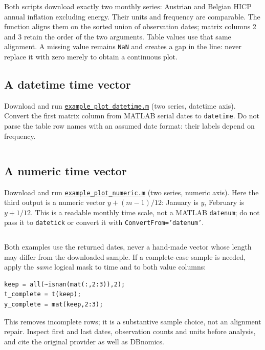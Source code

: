 \documentclass[a4paper,12pt]{article}
\begin{document}
Both scripts download exactly two monthly series: Austrian and Belgian HICP
annual inflation excluding energy. Their units and frequency are comparable.
The function aligns them on the sorted union of observation dates; matrix
columns 2 and 3 retain the order of the two arguments. Table values use that
same alignment. A missing value remains \texttt{NaN} and creates a gap in the
line: never replace it with zero merely to obtain a continuous plot.

\subsection*{A datetime time vector}
Download and run \href{https://raw.githubusercontent.com/Vermandel/dbnomics-teaching/1ff66c0c5d96b06556e5c0a202877cdc4a117d74/examples/example_plot_datetime.m}{\texttt{example\_plot\_datetime.m}} (two series, datetime axis). Convert the first matrix
column from MATLAB serial dates to \texttt{datetime}. Do not parse the table
row names with an assumed date format: their labels depend on frequency.
\inputminted[firstline=6]{matlab}{examples/example_plot_datetime.m}

\clearpage
\subsection*{A numeric time vector}
Download and run \href{https://raw.githubusercontent.com/Vermandel/dbnomics-teaching/1ff66c0c5d96b06556e5c0a202877cdc4a117d74/examples/example_plot_numeric.m}{\texttt{example\_plot\_numeric.m}} (two series, numeric axis). Here the third output is a
numeric vector $y+(m-1)/12$: January is $y$, February is $y+1/12$.
This is a readable monthly time scale, not a MATLAB \texttt{datenum}; do not
pass it to \texttt{datetick} or convert it with \texttt{ConvertFrom='datenum'}.
\inputminted[firstline=6]{matlab}{examples/example_plot_numeric.m}

Both examples use the returned dates, never a hand-made vector whose length
may differ from the downloaded sample. If a complete-case sample is needed,
apply the \emph{same} logical mask to time and to both value columns:
\begin{verbatim}
keep = all(~isnan(mat(:,2:3)),2);
t_complete = t(keep);
y_complete = mat(keep,2:3);
\end{verbatim}
This removes incomplete rows; it is a substantive sample choice, not an
alignment repair. Inspect first and last dates, observation counts and units
before analysis, and cite the original provider as well as DBnomics.

\medskip{}
\end{document}
